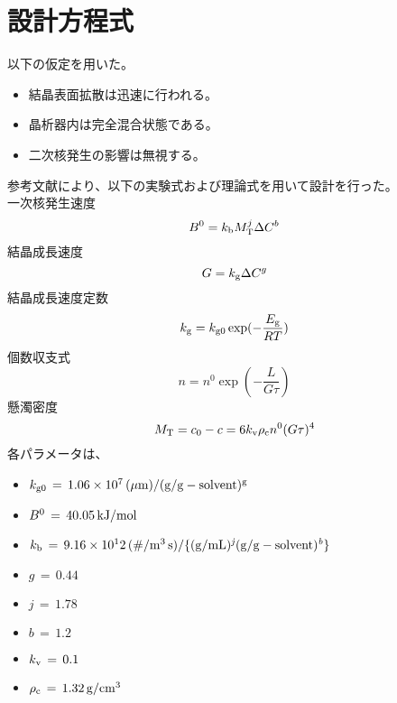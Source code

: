 \documentclass[a4j]{jsreport}
\begin{document}
\section{設計方程式}
以下の仮定を用いた。
\begin{itemize}
    \setlength{\parskip}{0pt}
    \setlength{\itemsep}{2pt} 
    \item[] 結晶表面拡散は迅速に行われる。\\
    \item[] 晶析器内は完全混合状態である。\\
    \item[] 二次核発生の影響は無視する。
\end{itemize}

参考文献により、以下の実験式および理論式を用いて設計を行った。\\
一次核発生速度
\begin{equation}
    B^0 = k_{{\rm b}}M_{{\rm T}}^j \Delta C^b
\end{equation}
結晶成長速度
\begin{equation}
    G = k_{{\rm g}}\Delta C^g
\end{equation}
結晶成長速度定数
\begin{equation}
    k_{{\rm g}} = k_{{\rm g0}} \exp(-\frac{E_{{\rm g}}}{RT})
\end{equation}
個数収支式
\begin{equation}
    n=n^0 \exp(-\frac{L}{G\tau})
\end{equation}
懸濁密度
\begin{equation}
    M_{{\rm T}} = c_0-c = 6k_{{\rm v}}\rho_{{\rm c}}n^0(G\tau)^4
\end{equation}
各パラメータは、
\begin{itemize}
\item[] $k_{{\rm g0}}\,=\,1.06\times10^7\,{\rm (\mu m)/(g/g-solvent)^g}$\\
\item[] $B^{{\rm 0}}\,=\,40.05\,{\rm kJ/mol}$\\
\item[] $k_{{\rm b}}\,=\,9.16\times10^12\,{\rm (\#/ m^3\,s)/\{(g/mL)^{{\it j}}(g/g-solvent)^{{\it b}}\}}$\\
\item[] $g\,=\,0.44\,$\\
\item[] $j\,=\,1.78\,$\\
\item[] $b\,=\,1.2\,$\\
\item[] $k_{{\rm v}}\,=\,0.1\,$\\
\item[] $\rho_{{\rm c}}\,=\,1.32\,{\rm g/cm^3}$ 
\end{itemize}
\end{document}
